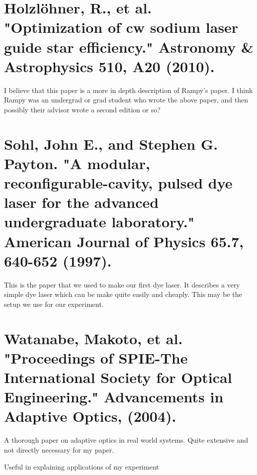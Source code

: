 \documentclass{article}
\begin{document}
\section*{Holzlöhner, R., et al. "Optimization of cw sodium laser guide star efficiency." Astronomy \& Astrophysics 510, A20 (2010).}

I believe that this paper is a more in depth description of Rampy's paper. I think Rampy was an undergrad or grad student who wrote the above paper, and then possibly their advisor wrote a second edition or so?

%

\section*{Sohl, John E., and Stephen G. Payton. "A modular, reconfigurable-cavity, pulsed dye laser for the advanced undergraduate laboratory." American Journal of Physics 65.7, 640-652 (1997).}

This is the paper that we used to make our first dye laser. It describes a very simple dye laser which can be make quite easily and cheaply. This may be the setup we use for our experiment.

\section*{ Watanabe, Makoto, et al. "Proceedings of SPIE-The International Society for Optical Engineering." Advancements in Adaptive Optics, (2004).}
A thorough paper on adaptive optics in real world systems. Quite extensive and not directly necessary for my paper.

Useful in explaining applications of my experiment

\end{document}
